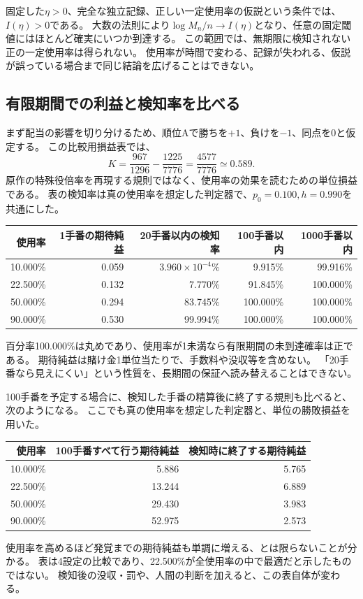 \documentclass[11pt,a4paper]{article}
\numberwithin{equation}{section}
\begin{document}
固定した$\eta>0$、完全な独立記録、正しい一定使用率の仮説という条件では、$I(\eta)>0$である。
大数の法則により$\log M_n/n\to I(\eta)$となり、任意の固定閾値にはほとんど確実にいつか到達する。
この範囲では、無期限に検知されない正の一定使用率は得られない。
使用率が時間で変わる、記録が失われる、仮説が誤っている場合まで同じ結論を広げることはできない。

\subsection{有限期間での利益と検知率を比べる}
まず配当の影響を切り分けるため、順位Aで勝ちを$+1$、負けを$-1$、同点を0と仮定する。
この比較用損益表では、
\[
K=\frac{967}{1296}-\frac{1225}{7776}
=\frac{4577}{7776}\simeq0.589.
\]
原作の特殊役倍率を再現する規則ではなく、使用率の効果を読むための単位損益である。
表の検知率は真の使用率を想定した判定器で、$p_0=0.100,h=0.990$を共通にした。

\begin{center}
\small
\begin{tabular}{rrrrr}
\toprule
使用率&1手番の期待純益&20手番以内の検知率&100手番以内&1000手番以内\\
\midrule
10.000\%&0.059&$3.960\times10^{-4}\%$&9.915\%&99.916\%\\
22.500\%&0.132&7.770\%&91.845\%&100.000\%\\
50.000\%&0.294&83.745\%&100.000\%&100.000\%\\
90.000\%&0.530&99.994\%&100.000\%&100.000\%\\
\bottomrule
\end{tabular}
\end{center}
百分率100.000\%は丸めであり、使用率が1未満なら有限期間の未到達確率は正である。
期待純益は賭け金1単位当たりで、手数料や没収等を含めない。
「20手番なら見えにくい」という性質を、長期間の保証へ読み替えることはできない。

100手番を予定する場合に、検知した手番の精算後に終了する規則も比べると、次のようになる。
ここでも真の使用率を想定した判定器と、単位の勝敗損益を用いた。
\begin{center}
\begin{tabular}{rrr}
\toprule
使用率&100手番すべて行う期待純益&検知時に終了する期待純益\\
\midrule
10.000\%&5.886&5.765\\
22.500\%&13.244&6.889\\
50.000\%&29.430&3.983\\
90.000\%&52.975&2.573\\
\bottomrule
\end{tabular}
\end{center}
使用率を高めるほど発覚までの期待純益も単調に増える、とは限らないことが分かる。
表は4設定の比較であり、22.500\%が全使用率の中で最適だと示したものではない。
検知後の没収・罰や、人間の判断を加えると、この表自体が変わる。
\end{document}
